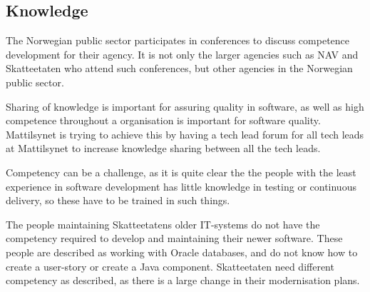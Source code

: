 

\subsection{Knowledge}
The Norwegian public sector participates in conferences to discuss competence development for their agency. It is not only the larger agencies such as NAV and Skatteetaten who attend such conferences, but other agencies in the Norwegian public sector.

Sharing of knowledge is important for assuring quality in software, as well as high competence throughout a organisation is important for software quality. Mattilsynet is trying to achieve this by having a tech lead forum for all tech leads at Mattilsynet to increase knowledge sharing between all the tech leads.

Competency can be a challenge, as it is quite clear the the people with the least experience in software development has little knowledge in testing or continuous delivery, so these have to be trained in such things.

The people maintaining Skatteetatens older IT-systems do not have the competency required to develop and maintaining their newer software. These people are described as working with Oracle databases, and do not know how to create a user-story or create a Java component. Skatteetaten need different competency as described, as there is a large change in their modernisation plans.

